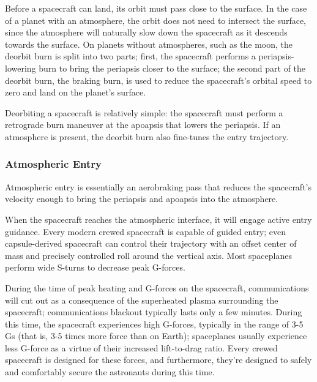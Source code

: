 Before a spacecraft can land, its orbit must pass close to the
surface. In the case of a planet with an atmosphere, the orbit does
not need to intersect the surface, since the atmosphere will naturally
slow down the spacecraft as it descends towards the surface. On
planets without atmospheres, such as the moon, the deorbit burn is
split into two parts; first, the spacecraft performs a
periapsis-lowering burn to bring the periapsis closer to the surface;
the second part of the deorbit burn, the braking burn, is used to
reduce the spacecraft's orbital speed to zero and land on the planet's
surface.

Deorbiting a spacecraft is relatively simple: the spacecraft must
perform a retrograde burn maneuver at the apoapsis that lowers the
periapsis. If an atmosphere is present, the deorbit burn also
fine-tunes the entry trajectory.

\subsubsection{Atmospheric Entry}
\label{subsubsec:atmospheric-entry}

Atmospheric entry is essentially an aerobraking pass that reduces the
spacecraft's velocity enough to bring the periapsis and apoapsis into
the atmosphere.


When the spacecraft reaches the atmospheric interface, it will engage
active entry guidance. Every modern crewed spacecraft is capable of
guided entry; even capsule-derived spacecraft can control their
trajectory with an offset center of mass and precisely controlled roll
around the vertical axis. Most spaceplanes perform wide S-turns to
decrease peak G-forces.


\illustrationsoon

During the time of peak heating and G-forces on the spacecraft,
communications will cut out as a consequence of the superheated plasma
surrounding the spacecraft; communications blackout typically lasts
only a few minutes. During this time, the spacecraft experiences high
G-forces, typically in the range of 3-5 Gs (that is, 3-5 times more
force than on Earth); spaceplanes usually experience less G-force as a
virtue of their increased lift-to-drag ratio. Every crewed spacecraft
is designed for these forces, and furthermore, they're designed to
safely and comfortably secure the astronauts during this time.

